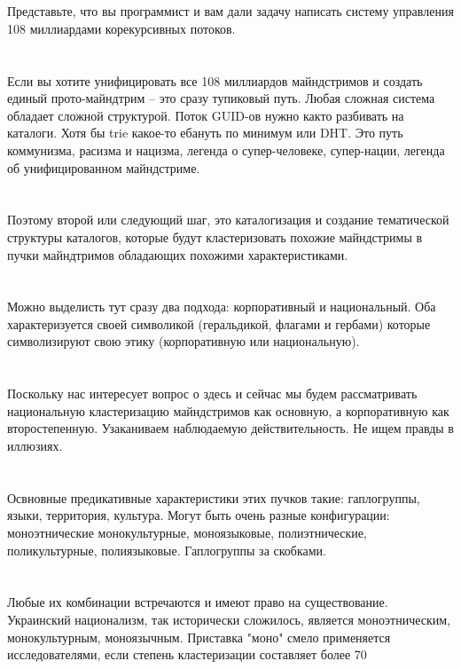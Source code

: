 \\
\\
Представьте, что вы программист и вам дали задачу написать систему управления 108 миллиардами корекурсивных потоков.\\
\\
\\
Если вы хотите унифицировать все 108 миллиардов майндстримов и создать единый прото-майндтрим -- это сразу тупиковый путь. Любая сложная система обладает сложной структурой. Поток GUID-ов нужно както разбивать на каталоги. Хотя бы trie какое-то ебануть по минимум или DHT. Это путь коммунизма, расизма и нацизма, легенда о супер-человеке, супер-нации, легенда об унифицированном майндстриме.\\
\\
\\
Поэтому второй или следующий шаг, это каталогизация и создание тематической структуры каталогов, которые будут кластеризовать похожие майндстримы в пучки майндтримов обладающих похожими характеристиками.\\
\\
\\
Можно выделисть тут сразу два подхода: корпоративный и национальный. Оба характеризуется своей символикой (геральдикой, флагами и гербами) которые символизируют свою этику (корпоративную или национальную).\\
\\
\\
Поскольку нас интересует вопрос о здесь и сейчас мы будем рассматривать национальную кластеризацию майндстримов как основную, а корпоративную как второстепенную. Узаканиваем наблюдаемую действительность. Не ищем правды в иллюзиях.\\
\\
\\
Освновные предикативные характеристики этих пучков такие: гаплогруппы, языки, территория, культура. Могут быть очень разные конфигурации: моноэтнические монокультурные, моноязыковые, полиэтнические, поликультурные, полиязыковые. Гаплогруппы за скобками.\\
\\
\\
Любые их комбинации встречаются и имеют право на существование. Украинский национализм, так исторически сложилось, является моноэтническим, монокультурным, моноязычным. Приставка "моно" смело применяется исследователями, если степень кластеризации составляет более 70%
\\
